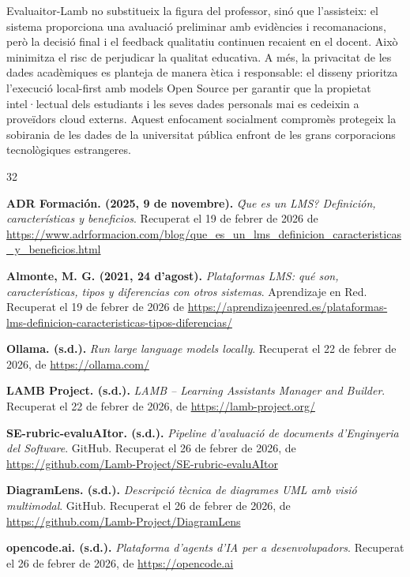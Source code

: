 \documentclass[12pt,a4paper,twoside]{report}
\begin{document}
Evaluaitor-Lamb no substitueix la figura del professor, sin\'o que l'assisteix: el sistema proporciona una avaluaci\'o preliminar amb evid\`encies i recomanacions, per\`o la decisi\'o final i el feedback qualitatiu continuen recaient en el docent. Aix\`o minimitza el risc de perjudicar la qualitat educativa. A m\'es, la privacitat de les dades acad\`emiques es planteja de manera \`etica i responsable: el disseny prioritza l'execuci\'o local-first amb models Open Source per garantir que la propietat intel·lectual dels estudiants i les seves dades personals mai es cedeixin a prove\"idors cloud externs. Aquest enfocament socialment comprom\`es protegeix la sobirania de les dades de la universitat p\'ublica enfront de les grans corporacions tecnol\`ogiques estrangeres.
\begin{thebibliography}{32}

     \textbf{ADR Formaci\'on. (2025, 9 de novembre).} \textit{\'Que es un LMS? Definici\'on, caracter\'isticas y beneficios}. Recuperat el 19 de febrer de 2026 de \url{https://www.adrformacion.com/blog/que_es_un_lms_definicion_caracteristicas_y_beneficios.html}

     \textbf{Almonte, M. G. (2021, 24 d'agost).} \textit{Plataformas LMS: qu\'e son, caracter\'isticas, tipos y diferencias con otros sistemas}. Aprendizaje en Red. Recuperat el 19 de febrer de 2026 de \url{https://aprendizajeenred.es/plataformas-lms-definicion-caracteristicas-tipos-diferencias/}

     \textbf{Ollama. (s.d.).} \textit{Run large language models locally}. Recuperat el 22 de febrer de 2026, de \url{https://ollama.com/}

     \textbf{LAMB Project. (s.d.).} \textit{LAMB -- Learning Assistants Manager and Builder}. Recuperat el 22 de febrer de 2026, de \url{https://lamb-project.org/}

     \textbf{SE-rubric-evaluAItor. (s.d.).} \textit{Pipeline d'avaluaci\'o de documents d'Enginyeria del Software}. GitHub. Recuperat el 26 de febrer de 2026, de \url{https://github.com/Lamb-Project/SE-rubric-evaluAItor}

     \textbf{DiagramLens. (s.d.).} \textit{Descripci\'o t\`ecnica de diagrames UML amb visi\'o multimodal}. GitHub. Recuperat el 26 de febrer de 2026, de \url{https://github.com/Lamb-Project/DiagramLens}

     \textbf{opencode.ai. (s.d.).} \textit{Plataforma d'agents d'IA per a desenvolupadors}. Recuperat el 26 de febrer de 2026, de \url{https://opencode.ai}


\end{thebibliography}
\end{document}
